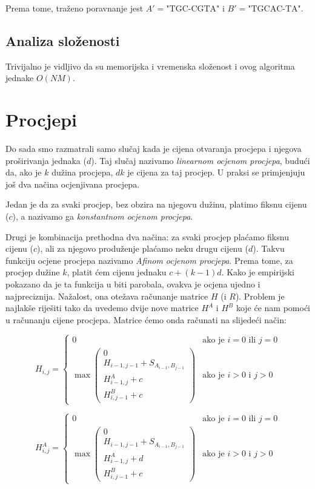 \documentclass[times, utf8, zavrsni]{fer}
\begin{document}
Prema tome, traženo poravnanje jest $A' = \mbox{"TGC-CGTA"}$ i
$B' = \mbox{"TGCAC-TA"}$.

\subsection{Analiza složenosti}
Trivijalno je vidljivo da su memorijska i vremenska složenost i ovog algoritma 
jednake $O(NM)$. 


\section{Procjepi}
Do sada smo razmatrali samo slučaj kada je cijena otvaranja procjepa i
njegova proširivanja jednaka ($d$). Taj slučaj nazivamo
\textit{linearnom ocjenom procjepa},
budući da, ako je $k$ dužina procjepa, $dk$ je cijena za taj procjep. 
U praksi se primjenjuju još dva načina ocjenjivana procjepa.

Jedan je da za svaki procjep, bez obzira na njegovu dužinu, platimo fiksnu
cijenu ($c$), a nazivamo ga \textit{konstantnom ocjenom procjepa}. 

Drugi je kombinacija prethodna dva načina: za svaki procjep plaćamo fiksnu
cijenu ($c$), ali za njegovo produženje plaćamo neku drugu cijenu ($d$).
Takvu funkciju ocjene procjepa nazivamo \textit{Afinom ocjenom procjepa}.
Prema tome, za procjep dužine $k$, platit ćem cijenu jednaku $c + (k-1)d$.
Kako je empirijski pokazano da je ta funkcija u biti parobala, ovakva je
ocjena ujedno i najpreciznija. Nažalost, ona otežava računanje matrice
$H$ (i $R$). Problem je najlakše riješiti tako da uvedemo dvije nove
matrice $H^A$ i $H^B$ koje će nam pomoći u računanju cijene procjepa.
Matrice ćemo onda računati na slijedeći način:

$$
H_{i,j} =
\left\{ \begin{array}{ll}
	0 & \mbox{ako je } i=0 \mbox{ ili } j=0 \\
	\max \left( \begin{array}{l}
		0 \\
		H_{i-1,j-1} + S_{A_{i-1}, B_{j-1}} \\
		H^A_{i-1, j} + c \\
		H^B_{i, j-1} + c
	\end{array} \right) & \mbox{ako je } i>0 \mbox{ i } j>0
\end{array} \right.
$$

$$
H^{A}_{i,j} =
\left\{ \begin{array}{ll}
	0 & \mbox{ako je } i=0 \mbox{ ili } j=0 \\
	\max \left( \begin{array}{l}
		0 \\
		H_{i-1,j-1} + S_{A_{i-1}, B_{j-1}} \\
		H^A_{i-1, j} + d \\
		H^B_{i, j-1} + c
	\end{array} \right) & \mbox{ako je } i>0 \mbox{ i } j>0
\end{array} \right.
$$
\end{document}
